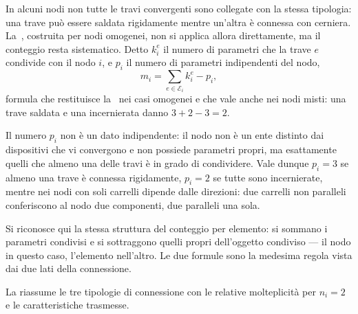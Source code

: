 \begin{oss}
	In alcuni nodi non tutte le travi convergenti sono
	collegate con la stessa tipologia: una trave può essere
	saldata rigidamente mentre un'altra è connessa con
	cerniera. La~, costruita per nodi
	omogenei, non si applica allora direttamente, ma il
	conteggio resta sistematico. Detto $k^e_i$ il numero di
	parametri che la trave $e$ condivide con il nodo $i$, e
	$p_i$ il numero di parametri indipendenti del nodo,
		\begin{equation}\label{eq:molt_nodo_misto}
		m_i = \sum_{e \in \mathcal{E}_i} k^e_i - p_i ,
	\end{equation}
	formula che restituisce la~ nei casi
	omogenei e che vale anche nei nodi misti: una trave
	saldata e una incernierata danno $3 + 2 - 3 = 2$.
	
	Il numero $p_i$ non è un dato indipendente: il nodo non è
	un ente distinto dai dispositivi che vi convergono e non
	possiede parametri propri, ma esattamente quelli che
	almeno una delle travi è in grado di condividere. Vale
	dunque $p_i = 3$ se almeno una trave è connessa
	rigidamente, $p_i = 2$ se tutte sono incernierate, mentre
	nei nodi con soli carrelli dipende dalle direzioni: due
	carrelli non paralleli conferiscono al nodo due
	componenti, due paralleli una sola.
	
	Si riconosce qui la stessa struttura del conteggio per
	elemento: si sommano i parametri condivisi e si
	sottraggono quelli propri dell'oggetto condiviso --- il
	nodo in questo caso, l'elemento nell'altro. Le due
	formule sono la medesima regola vista dai due lati della
	connessione.
\end{oss}

La  riassume le tre tipologie
di connessione con le relative molteplicità per $n_i = 2$
e le caratteristiche trasmesse.

